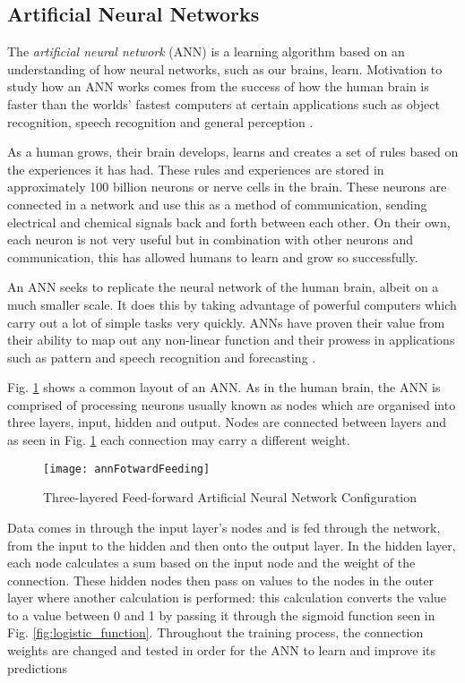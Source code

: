 \subsection{Artificial Neural Networks} \label{neuralNets}
The \textit{artificial neural network} (ANN) is a learning algorithm based on an understanding of how neural networks, such as our brains, learn. Motivation to study how an ANN works comes from the success of how the human brain is faster than the worlds' fastest computers at certain applications such as object recognition, speech recognition and general perception \citep{haykin_neural_1998}.

As a human grows, their brain develops, learns and creates a set of rules based on the experiences it has had. These rules and experiences are stored in approximately 100 billion neurons or nerve cells in the brain. These neurons are connected in a network and use this as a method of communication, sending electrical and chemical signals back and forth between each other. On their own, each neuron is not very useful but in combination with other neurons and communication, this has allowed humans to learn and grow so successfully. 

An ANN seeks to replicate the neural network of the human brain, albeit on a much smaller scale. It does this by taking advantage of powerful computers which carry out a lot of simple tasks very quickly. ANNs have proven their value from their ability to map out any non-linear function \citep{white_learning_1989} and their prowess in applications such as pattern and speech recognition and forecasting \citep{kaastra_forecasting_1995}.

Fig. \ref{fig:annFotwardFeeding} shows a common layout of an ANN. As in the human brain, the ANN is comprised of processing neurons usually known as nodes which are organised into three layers, input, hidden and output. Nodes are connected between layers and as seen in Fig. \ref{fig:annFotwardFeeding} each connection may carry a different weight.

\begin{figure}[H]
	\texttt{[image: annFotwardFeeding]}
	\caption{Three-layered Feed-forward Artificial Neural Network Configuration \\
				\cite[Source:][]{raju_development_2011}
			}
	\label{fig:annFotwardFeeding}
\end{figure}

Data comes in through the input layer's nodes and is fed through the network, from the input to the hidden and then onto the output layer. In the hidden layer, each node calculates a sum based on the input node and the weight of the connection. These hidden nodes then pass on values to the nodes in the outer layer where another calculation is performed: this calculation converts the value to a value between 0 and 1 by passing it through the sigmoid function seen in Fig. \ref{fig:logistic_function}. Throughout the training process, the connection weights are changed and tested in order for the ANN to learn and improve its predictions \citep{haykin_neural_1998}

